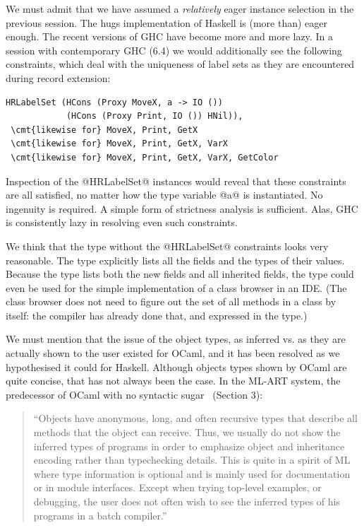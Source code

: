 \documentclass{jfp}
\newcommand{\cmt}[1]{\mbox{\textrm{\emph{#1}}}}
\begin{document}
We must admit that we have assumed a \emph{relatively} eager instance
selection in the previous session. The hugs implementation of Haskell
is (more than) eager enough. The recent versions of GHC have become
more and more lazy. In a session with contemporary GHC (6.4) we would
additionally see the following constraints, which deal with the
uniqueness of label sets as they are encountered during record
extension:

\begin{Verbatim}[fontsize=\small,commandchars=\\\{\}]
 HRLabelSet (HCons (Proxy MoveX, a -> IO ())
            (HCons (Proxy Print, IO ()) HNil)),
 \cmt{likewise for} MoveX, Print, GetX
 \cmt{likewise for} MoveX, Print, GetX, VarX
 \cmt{likewise for} MoveX, Print, GetX, VarX, GetColor
\end{Verbatim}
 
Inspection of the @HRLabelSet@ instances would reveal that these
constraints are all satisfied, no matter how the type variable @a@ is
instantiated. No ingenuity is required. A simple form of strictness
analysis is sufficient. Alas, GHC is consistently lazy in resolving
even such constraints.

We think that the type without the @HRLabelSet@ constraints looks very
reasonable. The type explicitly lists all the fields and the types of
their values. Because the type lists both the new fields and all
inherited fields, the type could even be used for the simple
implementation of a class browser in an IDE. (The class browser does
not need to figure out the set of all methods in a class by itself:
the compiler has already done that, and expressed in the type.)

We must mention that the issue of the object types, as inferred vs. as
they are actually shown to the user existed for OCaml, and it has been
resolved as we hypothesised it could for Haskell. Although objects
types shown by OCaml are quite concise, that has not always been the
case. In the {ML-ART} system, the predecessor of OCaml with no
syntactic sugar~\cite{ML-ART} (Section 3):

\begin{quote}\small
``Objects have anonymous, long, and often recursive
types that describe all methods that the object can receive. Thus, we
usually do not show the inferred types of programs in order to
emphasize object and inheritance encoding rather than typechecking
details. This is quite in a spirit of ML where type information is
optional and is mainly used for documentation or in module
interfaces. Except when trying top-level examples, or debugging, the
user does not often wish to see the inferred types of his programs in
a batch compiler.''
\end{quote}
\end{document}
